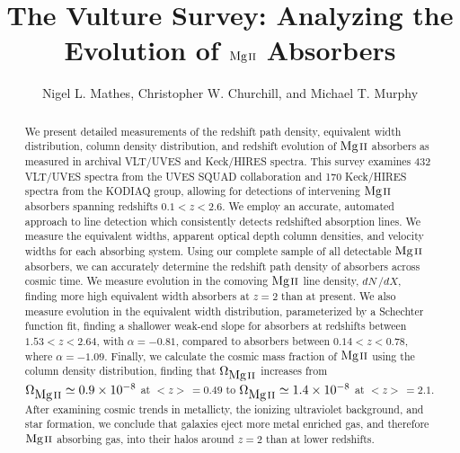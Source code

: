 \documentclass[iop,apj,numberedappendix,appendixfloats,twocolappendix]{emulateapj}
\begin{document}
\title{The Vulture Survey: Analyzing the Evolution of ${\hbox{{\rm Mg}\kern 0.1em{\sc ii}}}$ Absorbers}

\author{
Nigel L. Mathes,
Christopher W. Churchill,
and
Michael T. Murphy
}


\begin{abstract}
We present detailed measurements of the redshift path density, equivalent width distribution, column density distribution, and redshift evolution of ${\hbox{{\rm Mg}\kern 0.1em{\sc ii}}}$ absorbers as measured in archival VLT/UVES and Keck/HIRES spectra. This survey examines 432 VLT/UVES spectra from the UVES SQUAD collaboration and 170 Keck/HIRES spectra from the KODIAQ group, allowing for detections of intervening ${\hbox{{\rm Mg}\kern 0.1em{\sc ii}}}$ absorbers spanning redshifts $0.1 < z < 2.6$. We employ an accurate, automated approach to line detection which consistently detects redshifted absorption lines. We measure the equivalent widths, apparent optical depth column densities, and velocity widths for each absorbing system. Using our complete sample of all detectable ${\hbox{{\rm Mg}\kern 0.1em{\sc ii}}}$ absorbers, we can accurately determine the redshift path density of absorbers across cosmic time. We measure evolution in the comoving ${\hbox{{\rm Mg}\kern 0.1em{\sc ii}}}$ line density, $dN\,/dX$, finding more high equivalent width absorbers at $z = 2$ than at present. We also measure evolution in the equivalent width distribution, parameterized by a Schechter function fit, finding a shallower weak-end slope for absorbers at redshifts between $1.53 < z < 2.64$, with $\alpha = -0.81$, compared to absorbers between $0.14 < z < 0.78$, where $\alpha = -1.09$. Finally, we calculate the cosmic mass fraction of ${\hbox{{\rm Mg}\kern 0.1em{\sc ii}}}$ using the column density distribution, finding that $\Omega_{\hbox{{\rm Mg}\kern 0.1em{\sc ii}}}$ increases from $\Omega_{\hbox{{\rm Mg}\kern 0.1em{\sc ii}}} \simeq 0.9\times10^{-8}$ at $<z>\,= 0.49$ to $\Omega_{\hbox{{\rm Mg}\kern 0.1em{\sc ii}}} \simeq 1.4\times10^{-8}$ at $<z>\,= 2.1$. After examining cosmic trends in metallicty, the ionizing ultraviolet background, and star formation, we conclude that galaxies eject more metal enriched gas, and therefore ${\hbox{{\rm Mg}\kern 0.1em{\sc ii}}}$ absorbing gas, into their halos around $z = 2$ than at lower redshifts. 

\end{abstract}


\end{document}
